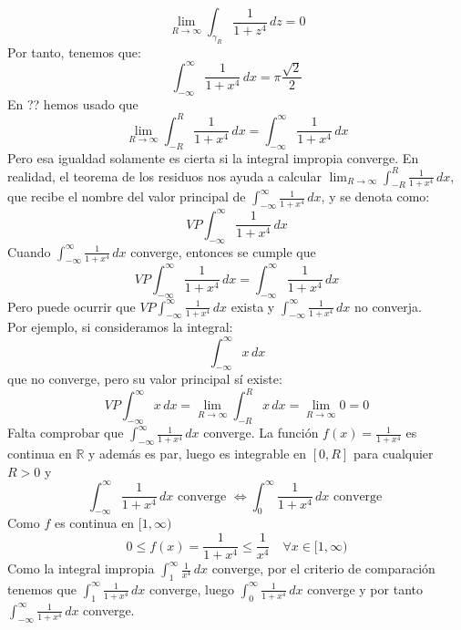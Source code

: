 {    \[
        \lim_{R \to \infty} \int_{\gamma_R} \frac{1}{1+z^4} \, dz = 0
    \]
    Por tanto, tenemos que:
    \[
        \int_{-\infty}^{\infty} \frac{1}{1+x^4} \, dx =
        \pi \frac{\sqrt{2}}{2}
    \]
    En ?? hemos usado que 
    \[
        \lim_{R \to \infty} \int_{-R}^{R} \frac{1}{1+x^4} \, dx =
        \int_{-\infty}^{\infty} \frac{1}{1+x^4} \, dx
    \]
    Pero esa igualdad solamente es cierta si la integral impropia converge. En realidad, el teorema de los residuos nos ayuda a calcular $\lim_{R \to \infty} \int_{-R}^{R} \frac{1}{1+x^4} \, dx$, que recibe el nombre del valor principal de $\int_{-\infty}^{\infty} \frac{1}{1+x^4} \, dx$, y se denota como:
    \[
        VP \int_{-\infty}^{\infty} \frac{1}{1+x^4} \, dx
    \]
    Cuando $\int_{-\infty}^{\infty} \frac{1}{1+x^4} \, dx$ converge, entonces se cumple que 
    \[
        VP \int_{-\infty}^{\infty} \frac{1}{1+x^4} \, dx =
        \int_{-\infty}^{\infty} \frac{1}{1+x^4} \, dx
    \]
    Pero puede ocurrir que $VP \int_{-\infty}^{\infty} \frac{1}{1+x^4} \, dx$ exista y $\int_{-\infty}^{\infty} \frac{1}{1+x^4} \, dx$ no converja.\\
    Por ejemplo, si consideramos la integral:
    \[
        \int_{-\infty}^{\infty} x \, dx
    \]
    que no converge, pero su valor principal sí existe:
    \[
        VP \int_{-\infty}^{\infty} x \, dx =
        \lim_{R \to \infty} \int_{-R}^{R} x \, dx =
        \lim_{R \to \infty} 0 =
        0
    \]
    Falta comprobar que $\int_{-\infty}^{\infty} \frac{1}{1+x^4} \, dx$ converge. La función $f(x) = \frac{1}{1+x^4}$ es continua en $\mathbb{R}$ y además es par, luego es integrable en $[0,R]$ para cualquier $R > 0$ y
    \[
        \int_{-\infty}^{\infty} \frac{1}{1+x^4} \, dx \text{ converge } \iff \int_{0}^{\infty} \frac{1}{1+x^4} \, dx \text{ converge }
    \]
    Como $f$ es continua en $[1,\infty)$
    \[
        0 \leq f(x) = \frac{1}{1+x^4} \leq \frac{1}{x^4} \quad \forall x \in [1,\infty)
    \]
    Como la integral impropia $\int_{1}^{\infty} \frac{1}{x^4} \, dx$ converge, por el criterio de comparación tenemos que $\int_{1}^{\infty} \frac{1}{1+x^4} \, dx$ converge, luego $\int_{0}^{\infty} \frac{1}{1+x^4} \, dx$ converge y por tanto $\int_{-\infty}^{\infty} \frac{1}{1+x^4} \, dx$ converge.
}

